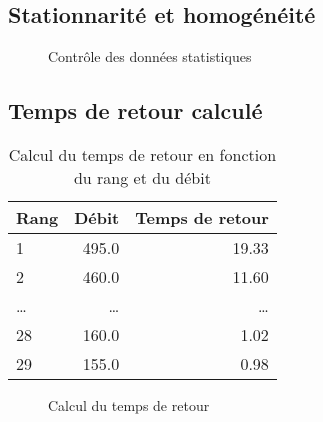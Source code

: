 \subsection{Stationnarité et homogénéité}
\begin{figure}[H]
    \centering
    \caption{Contrôle des données statistiques}
    \label{graph:controleData}
\end{figure}

\subsection{Temps de retour calculé}
\begin{multicols}{2}
    \begin{table}[H]
        \centering
        \begin{tabular}{l|r|r}
            \toprule
            \textbf{Rang} & \textbf{Débit} & \textbf{Temps de retour} \\
            \midrule
            1             &          495.0 &                    19.33 \\
            2             &          460.0 &                    11.60 \\
            \dots         &  \dots         & \dots                    \\
            28            &          160.0 &                     1.02 \\
            29            &          155.0 &                     0.98 \\
            \bottomrule
        \end{tabular}
        \caption{Calcul du temps de retour en fonction du rang et du débit}
        \label{tab:calcul_tempsRetour}
    \end{table}

    \columnbreak

    \begin{figure}[H]
        \centering
        \resizebox*{0.50\textwidth}{!}{
            
        }
        \caption{Calcul du temps de retour}
        \label{graph:calcul_tempsRetour}
    \end{figure}
\end{multicols}

